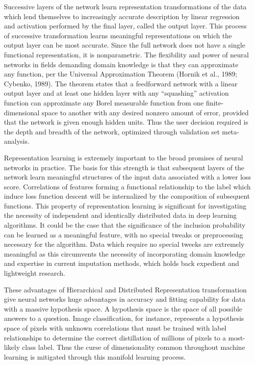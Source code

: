 \documentclass[12pt,twoside]{reedthesis}
\begin{document}
Successive layers of the network learn representation transformations of
the data which lend themselves to increasingly accurate description by
linear regression and activation performed by the final layer, called
the output layer. This process of successive transformation learns
meaningful representations on which the output layer can be most
accurate. Since the full network does not have a single functional
representation, it is nonparametric. The flexibility and power of neural
networks in fields demanding domain knowledge is that they can
approximate any function, per the Universal Approximation Theorem
(Hornik et al., 1989; Cybenko, 1989). The theorem states that a
feedforward network with a linear output layer and at least one hidden
layer with any ``squashing'' activation function can approximate any
Borel measurable function from one finite-dimensional space to another
with any desired nonzero amount of error, provided that the network is
given enough hidden units. Thus the user decision required is the depth
and breadth of the network, optimized through validation set
meta-analysis.

Representation learning is extremely important to the broad promises of
neural networks in practice. The basis for this strength is that
subsequent layers of the network learn meaningful structures of the
input data associated with a lower loss score. Correlations of features
forming a functional relationship to the label which induce loss
function descent will be internalized by the composition of subsequent
functions. This property of representation learning is significant for
investigating the necessity of independent and identically distributed
data in deep learning algorithms. It could be the case that the
significance of the inclusion probability can be learned as a meaningful
feature, with no special tweaks or preprocessing necessary for the
algorithm. Data which require no special tweeks are extremely meaningful
as this circumvents the necessity of incorporating domain knowledge and
expertise in current imputation methods, which holds back expedient and
lightweight research.

These advantages of Hierarchical and Distributed Representation
transformation give neural networks huge advantages in accuracy and
fitting capability for data with a massive hypothesis space. A
hypothesis space is the space of all possible answers to a question.
Image classification, for instance, represents a hypothesis space of
pixels with unknown correlations that must be trained with label
relationships to determine the correct distillation of millions of
pixels to a most-likely class label. Thus the curse of dimensionality
common throughout machine learning is mitigated through this manifold
learning process.
\end{document}
